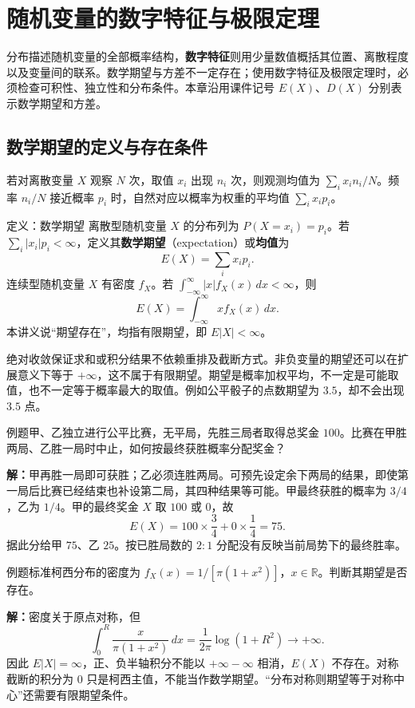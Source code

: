\documentclass[UTF8,fontset=none,zihao=-4,a4paper]{ctexart}
\newcommand{\term}[1]{\textbf{#1}}
\newcommand{\example}[1]{\begin{infobox}{例题}#1\end{infobox}}
\newcommand{\solution}{\par\noindent\textbf{解：}}
\newcommand{\chapterpage}[1]{\clearpage\section{#1}}
\begin{document}
\chapterpage{随机变量的数字特征与极限定理}
分布描述随机变量的全部概率结构，\term{数字特征}则用少量数值概括其位置、离散程度以及变量间的联系。数学期望与方差不一定存在；使用数字特征及极限定理时，必须检查可积性、独立性和分布条件。本章沿用课件记号 $E(X)$、$D(X)$ 分别表示数学期望和方差。

\subsection{数学期望的定义与存在条件}
若对离散变量 $X$ 观察 $N$ 次，取值 $x_i$ 出现 $n_i$ 次，则观测均值为 $\sum_i x_i n_i/N$。频率 $n_i/N$ 接近概率 $p_i$ 时，自然对应以概率为权重的平均值 $\sum_i x_ip_i$。
\begin{infobox}{定义：数学期望}
离散型随机变量 $X$ 的分布列为 $P(X=x_i)=p_i$。若 $\sum_i|x_i|p_i<\infty$，定义其\term{数学期望}（expectation）或\term{均值}为
\[
E(X)=\sum_i x_ip_i.
\]
连续型随机变量 $X$ 有密度 $f_X$。若 $\int_{-\infty}^{\infty}|x|f_X(x)\,dx<\infty$，则
\[
E(X)=\int_{-\infty}^{\infty}x f_X(x)\,dx.
\]
本讲义说“期望存在”，均指有限期望，即 $E|X|<\infty$。
\end{infobox}
绝对收敛保证求和或积分结果不依赖重排及截断方式。非负变量的期望还可以在扩展意义下等于 $+\infty$，这不属于有限期望。期望是概率加权平均，不一定是可能取值，也不一定等于概率最大的取值。例如公平骰子的点数期望为 $3.5$，却不会出现 $3.5$ 点。
\example{甲、乙独立进行公平比赛，无平局，先胜三局者取得总奖金 $100$。比赛在甲胜两局、乙胜一局时中止，如何按最终获胜概率分配奖金？}
\solution 甲再胜一局即可获胜；乙必须连胜两局。可预先设定余下两局的结果，即使第一局后比赛已经结束也补设第二局，其四种结果等可能。甲最终获胜的概率为 $3/4$，乙为 $1/4$。甲的最终奖金 $X$ 取 $100$ 或 $0$，故
\[
E(X)=100\times\frac34+0\times\frac14=75.
\]
据此分给甲 $75$、乙 $25$。按已胜局数的 $2:1$ 分配没有反映当前局势下的最终胜率。
\example{标准柯西分布的密度为 $f_X(x)=1/[\pi(1+x^2)]$，$x\in\mathbb R$。判断其期望是否存在。}
\solution 密度关于原点对称，但
\[
\int_0^R\frac{x}{\pi(1+x^2)}\,dx
=\frac1{2\pi}\log(1+R^2)\longrightarrow+\infty.
\]
因此 $E|X|=\infty$，正、负半轴积分不能以 $+\infty-\infty$ 相消，$E(X)$ 不存在。对称截断的积分为 $0$ 只是柯西主值，不能当作数学期望。“分布对称则期望等于对称中心”还需要有限期望条件。
\end{document}
